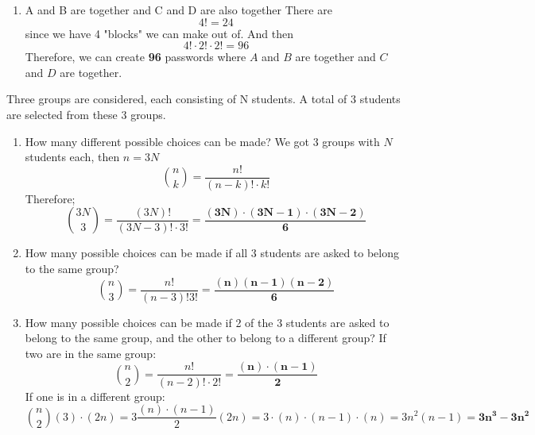 \documentclass{article}
\begin{document}
\begin{minipage}{\linewidth}
\begin{solutions}
\begin{enumerate}[label=\alph*)]
                
                \item A and B are together and C and D are also together
                There are 
                \[
                    4! = 24
                \]
                since we have 4 "blocks" we can make out of. And then
                \[
                    4! \cdot 2! \cdot 2! = 96
                \]
                Therefore, we can create \textbf{96} passwords where $A$ and $B$ are together and $C$ and $D$ are together.
                
            \end{enumerate}
            \medskip
        \end{solutions}
    \end{minipage}


        \begin{solutions}
            Three groups are considered, each consisting of N students. A total of 3 students are selected from these 3 groups.
            \begin{enumerate}[label=\alph*)]
                \item How many different possible choices can be made?
                We got 3 groups with $N$ students each, then $n = 3N$
                \[
                    \binom{n}{k} = \frac{n!}{(n-k)! \cdot k!}
                \]
                Therefore;
                \[
                    \binom{3N}{3} = \frac{(3N)!}{(3N-3)! \cdot 3!} = \frac{\mathbf{(3N)\cdot(3N-1)\cdot(3N-2)}}{\mathbf{6}}
                \]

                \item How many possible choices can be made if all 3 students are asked to belong to the same group?
                \[
                    \binom{n}{3} = \frac{n!}{(n-3)!3!}= \frac{\mathbf{(n)(n-1)(n-2)}}{\mathbf{6}}
                \]

                \item How many possible choices can be made if 2 of the 3 students are asked to belong to the same group, and the other to belong to a different group?
                If two are in the same group:
                \[
                    \binom{n}{2} = \frac{n!}{(n-2)! \cdot 2!} = \frac{\mathbf{(n) \cdot (n-1)}}{\mathbf{2}}
                \]
                If one is in a different group:
                \[
                    \binom{n}{2} (3) \cdot (2n) = 3 \frac{(n) \cdot (n - 1)}{2} (2n) =
                    3 \cdot (n) \cdot (n-1) \cdot (n) = 3n^2(n-1) = \mathbf{3n^3 - 3n^2}
                \]
                
            \end{enumerate}
        \end{solutions}
\end{document}
